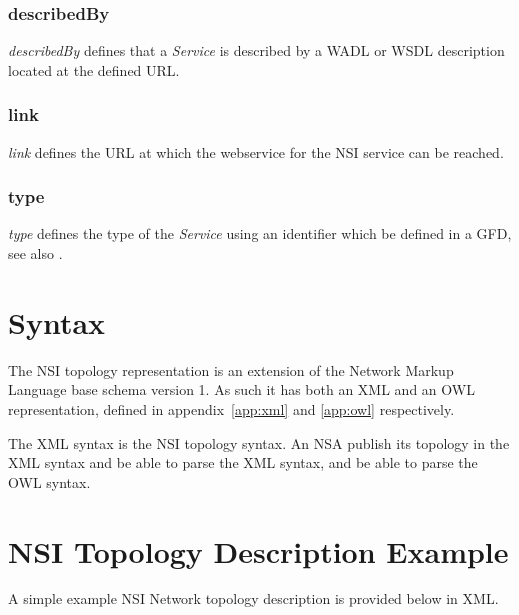 \documentclass[12pt]{article}  %
\begin{document}
\subsubsection{describedBy} %
\label{ssub:describedby}

\emph{describedBy} defines that a \emph{Service} is described by a WADL\cite{w3-wadl} or WSDL\cite{w3-wsdl} description located at the defined URL.


\subsubsection{link} %
\label{ssub:link}

\emph{link} defines the URL at which the webservice for the NSI service can be reached.


\subsubsection{type} %
\label{ssub:type}

\emph{type} defines the type of the \emph{Service} using an identifier which \SHOULD{} be defined in a GFD, see also \cite{gfd-discovery-service}.



\section{Syntax} %
\label{sec:syntax}

The NSI topology representation is an extension of the Network Markup Language base schema version 1. As such it has both an XML and an OWL representation, defined in appendix~\ref{app:xml} and \ref{app:owl} respectively.

The XML syntax is the \RECOMMENDED{} NSI topology syntax. An NSA \MUST{} publish its topology in the XML syntax and \MUST{} be able to parse the XML syntax, and \SHOULD{} be able to parse the OWL syntax.


\section{NSI Topology Description Example}

 A simple example NSI Network topology description is provided 
below in XML.
\end{document}
